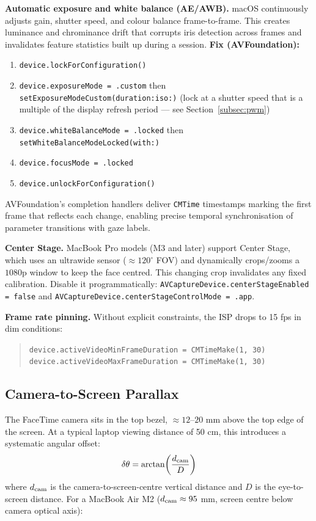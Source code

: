 \documentclass[11pt,a4paper]{article}
\begin{document}
\textbf{Automatic exposure and white balance (AE/AWB).}
macOS continuously adjusts gain, shutter speed, and colour balance frame-to-frame.
This creates luminance and chrominance drift that corrupts iris detection across frames
and invalidates feature statistics built up during a session.
\textbf{Fix (AVFoundation):}
\begin{enumerate}
  \item \texttt{device.lockForConfiguration()}
  \item \texttt{device.exposureMode = .custom} then \texttt{setExposureModeCustom(duration:iso:)}
        (lock at a shutter speed that is a multiple of the display refresh period ---
        see Section~\ref{subsec:pwm})
  \item \texttt{device.whiteBalanceMode = .locked} then \texttt{setWhiteBalanceModeLocked(with:)}
  \item \texttt{device.focusMode = .locked}
  \item \texttt{device.unlockForConfiguration()}
\end{enumerate}
AVFoundation's completion handlers deliver \texttt{CMTime} timestamps marking the first
frame that reflects each change, enabling precise temporal synchronisation of parameter
transitions with gaze labels.

\textbf{Center Stage.}
MacBook Pro models (M3 and later) support Center Stage, which uses an ultrawide sensor
($\approx120^\circ$ FOV) and dynamically crops/zooms a $1080$p window to keep the face centred.
This changing crop invalidates any fixed calibration.
Disable it programmatically:
\texttt{AVCaptureDevice.centerStageEnabled = false} and
\texttt{AVCaptureDevice.centerStageControlMode = .app}.

\textbf{Frame rate pinning.}
Without explicit constraints, the ISP drops to 15 fps in dim conditions:
\begin{quote}
\texttt{device.activeVideoMinFrameDuration = CMTimeMake(1, 30)}\\
\texttt{device.activeVideoMaxFrameDuration = CMTimeMake(1, 30)}
\end{quote}

\subsection{Camera-to-Screen Parallax}
\label{subsec:parallax}

The FaceTime camera sits in the top bezel, $\approx12$--$20$ mm above the top edge
of the screen.
At a typical laptop viewing distance of 50 cm, this introduces a systematic angular offset:
\begin{equation}
  \delta\theta = \arctan\!\left(\frac{d_{\rm cam}}{D}\right)
\end{equation}
where $d_{\rm cam}$ is the camera-to-screen-centre vertical distance and $D$ is the
eye-to-screen distance.
For a MacBook Air M2 ($d_{\rm cam} \approx 95$ mm, screen centre below camera optical axis):
\end{document}
